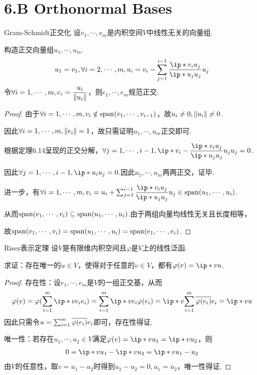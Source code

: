 \section{6.B Orthonormal Bases}

\begin{theorem}[6.31]\label{thm 6.31} Gram-Schmidt正交化 \: 
    设\(v_1,\cdots,v_m\)是内积空间\(V\)中线性无关的向量组.
    
    构造正交向量组\(u_1,\cdots,u_m\).
    \begin{align*}
        u_1=v_1,\forall i=2,\cdots,m,u_i=v_i-\sum_{j=1}^{i-1} \dfrac{\ip*{v_i}{u_j}}{\ip*{u_j}{u_j}}u_j
    \end{align*}
    令\(\forall i=1,\cdots,m,e_i=\dfrac{u_i}{\norm*{u_i}}\)，则\(e_1,\cdots,e_m\)规范正交.
\end{theorem}

\begin{proof}
    由于\(\forall i=1,\cdots,m,v_i \notin \altspan(v_1,\cdots,v_{i-1})\)，故\(u_i \ne 0,\norm*{u_i} \ne 0\).

    因此\(\forall i=1,\cdots,m,\norm*{e_i}=1\)，故只需证明\(u_1,\cdots,u_m\)正交即可.
    
    根据定理6.14呈现的正交分解，\(\forall j=1,\cdots,i-1,\ip*{v_i-\dfrac{\ip*{v_i}{u_j}}{\ip*{u_j}{u_j}}u_j}{u_j}=0\).
    
    因此\(\forall j=1,\cdots,i-1,\ip*{u_i}{u_j}=0\).因此\(u_1,\cdots,u_m\)两两正交，证毕.
    
    进一步，有\(\forall i=1,\cdots,m,v_i=u_i+\sum_{j=1}^{i-1} \dfrac{\ip*{v_i}{u_j}}{\ip*{u_j}{u_j}}u_j \in \altspan(u_1,\cdots,u_i)\).
    
    从而\(\altspan(v_1,\cdots,v_i) \subseteq \altspan(u_1,\cdots,u_i)\).由于两组向量均线性无关且长度相等，
    
    故\(\altspan(v_1,\cdots,v_i)=\altspan(u_1,\cdots,u_i)=\altspan(e_1,\cdots,e_i)\).
\end{proof}

\begin{theorem}[6.42]\label{thm 6.42} Risez表示定理 \:
    设\(V\)是有限维内积空间且\(\varphi\)是\(V\)上的线性泛函.

    求证：存在唯一的\(u \in V\)，使得对于任意的\(v \in V\)，都有\(\varphi(v)=\ip*{v}{u}\).
\end{theorem}

\begin{proof}
    存在性：设\(e_1,\cdots,e_m\)是\(V\)的一组正交基，从而
    \begin{align*}
        \varphi(v)=\varphi(\sum_{i=1}^m \ip*{v}{e_i}e_i)=\sum_{i=1}^m \ip*{v}{e_i}\varphi(e_i)
        =\ip*{v}{\sum_{i=1}^m \ol{\varphi(e_i)}e_i}=\ip*{v}{u}
    \end{align*}
    因此只需令\(u=\sum_{i=1}^m \ol{\varphi(e_i)}e_i\)即可，存在性得证.

    唯一性：若存在\(u_1,\cdots,u_2 \in V\)满足\(\varphi(v)=\ip*{v}{u_1}=\ip*{v}{u_2}\)，则
    \begin{align*}
        0=\ip*{v}{u_1}-\ip*{v}{u_2}=\ip*{v}{u_1-u_2}
    \end{align*}
    由\(V\)的任意性，取\(v=u_1-u_2\)时得到\(u_1-u_2=0,u_1=u_2\)，唯一性得证.
\end{proof}

